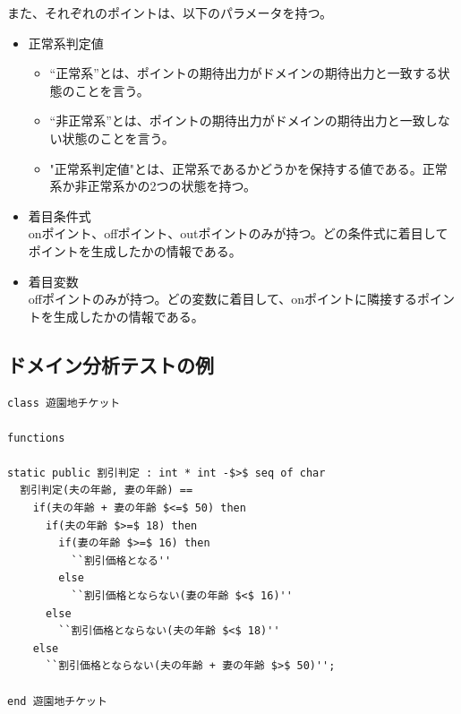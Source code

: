 \documentclass[uplatex, report, a4j, 10pt]{jsbook}
\begin{document}
また、それぞれのポイントは、以下のパラメータを持つ。
\begin{itemize}
  \item 正常系判定値
        \begin{itemize}
          \item “正常系”とは、ポイントの期待出力がドメインの期待出力と一致する状態のことを言う。
          \item “非正常系”とは、ポイントの期待出力がドメインの期待出力と一致しない状態のことを言う。
          \item "正常系判定値"とは、正常系であるかどうかを保持する値である。正常系か非正常系かの2つの状態を持つ。
        \end{itemize}
  \item 着目条件式\\
        onポイント、offポイント、outポイントのみが持つ。どの条件式に着目してポイントを生成したかの情報である。
  \item 着目変数\\
        offポイントのみが持つ。どの変数に着目して、onポイントに隣接するポイントを生成したかの情報である。
\end{itemize}

\subsection{ドメイン分析テストの例}
\lstset{language=}
\noindent\begin{minipage}{\textwidth}
  \begin{lstlisting}[caption=ドメインテストが必要となる仕様(遊園地チケット割引機能),label=fig:vdm_park]
class 遊園地チケット

functions

static public 割引判定 : int * int -$>$ seq of char
  割引判定(夫の年齢, 妻の年齢) ==
    if(夫の年齢 + 妻の年齢 $<=$ 50) then
      if(夫の年齢 $>=$ 18) then
        if(妻の年齢 $>=$ 16) then
          ``割引価格となる''
        else
          ``割引価格とならない(妻の年齢 $<$ 16)''
      else
        ``割引価格とならない(夫の年齢 $<$ 18)''
    else
      ``割引価格とならない(夫の年齢 + 妻の年齢 $>$ 50)'';

end 遊園地チケット
\end{lstlisting}
\end{minipage}
\end{document}
